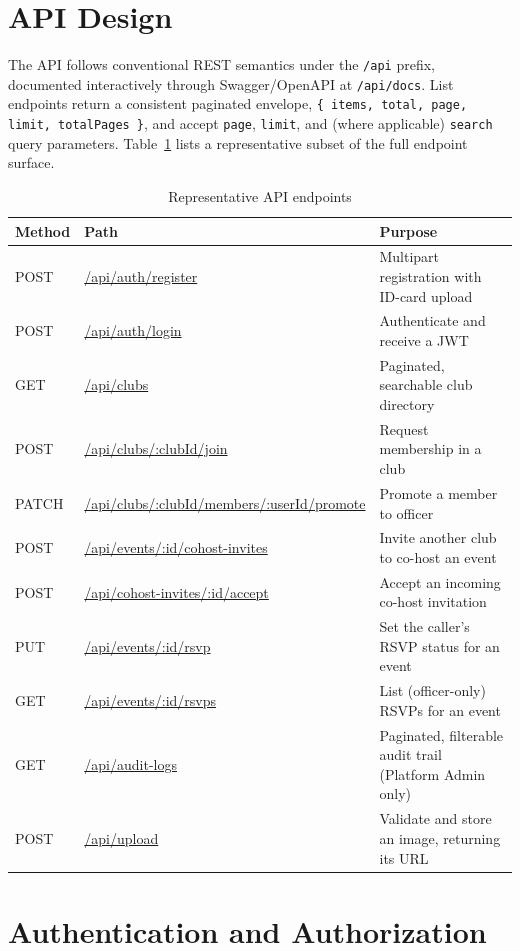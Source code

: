 \documentclass[12pt,oneside]{book}
\begin{document}
\section{API Design}

The API follows conventional REST semantics under the \texttt{/api} prefix, documented interactively through Swagger/OpenAPI at \texttt{/api/docs}. List endpoints return a consistent paginated envelope, \texttt{\{ items, total, page, limit, totalPages \}}, and accept \texttt{page}, \texttt{limit}, and (where applicable) \texttt{search} query parameters. Table~\ref{tab:4.4} lists a representative subset of the full endpoint surface.

\begin{table}[H]
\caption{Representative API endpoints}
\label{tab:4.4}
\centering
\small
\begin{tabularx}{\textwidth}{@{}p{1.3cm}p{4.6cm}X@{}}
\toprule
Method & Path & Purpose \\
\midrule
POST & \url{/api/auth/register} & Multipart registration with ID-card upload \\
POST & \url{/api/auth/login} & Authenticate and receive a JWT \\
GET & \url{/api/clubs} & Paginated, searchable club directory \\
POST & \url{/api/clubs/:clubId/join} & Request membership in a club \\
PATCH & \url{/api/clubs/:clubId/members/:userId/promote} & Promote a member to officer \\
POST & \url{/api/events/:id/cohost-invites} & Invite another club to co-host an event \\
POST & \url{/api/cohost-invites/:id/accept} & Accept an incoming co-host invitation \\
PUT & \url{/api/events/:id/rsvp} & Set the caller's RSVP status for an event \\
GET & \url{/api/events/:id/rsvps} & List (officer-only) RSVPs for an event \\
GET & \url{/api/audit-logs} & Paginated, filterable audit trail (Platform Admin only) \\
POST & \url{/api/upload} & Validate and store an image, returning its URL \\
\bottomrule
\end{tabularx}
\end{table}

\section{Authentication and Authorization}
\end{document}
